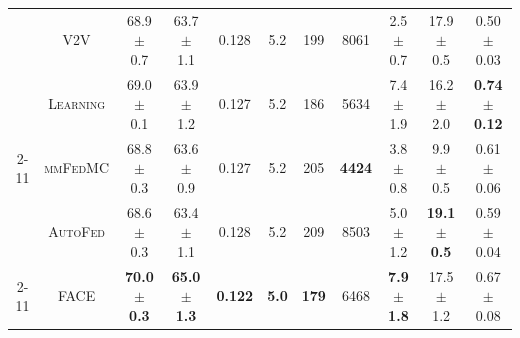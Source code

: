 \begin{table}[t]
\begin{tabular}{c|c|c|c|c|c|c|c|c|c|c}
        & \textsc{V2V} & 68.9 $\pm$ 0.7 & 63.7 $\pm$ 1.1 & 0.128 & 5.2 & 199 & 8061 & 2.5 $\pm$ 0.7 & 17.9 $\pm$ 0.5 & 0.50 $\pm$ 0.03 \\
        & \textsc{Learning} & 69.0 $\pm$ 0.1 & 63.9 $\pm$ 1.2 & 0.127 & 5.2 & 186 & 5634 & 7.4 $\pm$ 1.9 & 16.2 $\pm$ 2.0 & \textbf{0.74 $\pm$ 0.12} \\
        \cline{2-11}
        & \textsc{mmFedMC} & 68.8 $\pm$ 0.3 & 63.6 $\pm$ 0.9 & 0.127 & 5.2 & 205 & \textbf{4424} & 3.8 $\pm$ 0.8 & 9.9 $\pm$ 0.5 & 0.61 $\pm$ 0.06 \\
        & \textsc{AutoFed} & 68.6 $\pm$ 0.3 & 63.4 $\pm$ 1.1 & 0.128 & 5.2 & 209 & 8503 & 5.0 $\pm$ 1.2 & \textbf{19.1 $\pm$ 0.5} & 0.59 $\pm$ 0.04 \\
        \cline{2-11}
        & \textsc{FACE} & \textbf{70.0 $\pm$ 0.3} & \textbf{65.0 $\pm$ 1.3} & \textbf{0.122} & \textbf{5.0} & \textbf{179} & 6468 & \textbf{7.9 $\pm$ 1.8} & 17.5 $\pm$ 1.2 & 0.67 $\pm$ 0.08 \\
        \hline
    \end{tabular}
\end{table}
